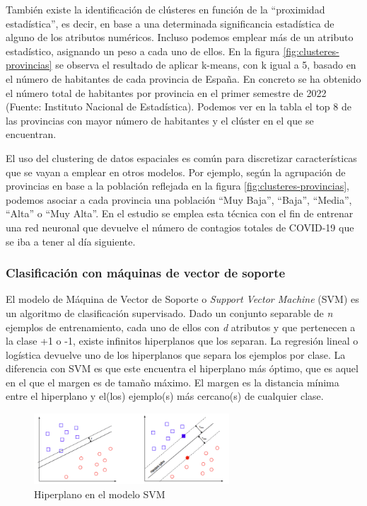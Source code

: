 También existe la identificación de clústeres en función de la “proximidad estadística”, es decir,
en base a una determinada significancia estadística de alguno de los atributos numéricos.
Incluso podemos emplear más de un atributo estadístico, asignando un peso a cada uno de ellos.
En la figura \ref{fig:clusteres-provincias} se observa el resultado de aplicar k-means, con k igual a 5, basado en el número de habitantes de cada provincia de España.
En concreto se ha obtenido el número total de habitantes por provincia en el primer semestre de 2022 (Fuente: Instituto Nacional de Estadística).
Podemos ver en la tabla el top 8 de las provincias con mayor número de habitantes y el clúster en el que se encuentran.

El uso del clustering de datos espaciales es común para discretizar características que se vayan a emplear en otros modelos.
Por ejemplo, según la agrupación de provincias en base a la población reflejada en la figura \ref{fig:clusteres-provincias},
podemos asociar a cada provincia una población “Muy Baja”, “Baja”, “Media”, “Alta” o “Muy Alta”.
En el estudio \cite{COVID} se emplea esta técnica con el fin de entrenar una red neuronal que devuelve el número de contagios totales de COVID-19
que se iba a tener al día siguiente.  

\subsubsection{Clasificación con máquinas de vector de soporte}
El modelo de Máquina de Vector de Soporte o \textit{Support Vector Machine} (SVM) es un algoritmo de clasificación supervisado.
Dado un conjunto separable de \textit{n} ejemplos de entrenamiento, cada uno de ellos con \textit{d} atributos y que pertenecen a la clase +1 o -1, 
existe infinitos hiperplanos que los separan. La regresión lineal o logística devuelve uno de los hiperplanos que separa los ejemplos por clase.
La diferencia con SVM es que este encuentra el hiperplano más óptimo, que es aquel en el que el margen es de tamaño máximo.
El margen es la distancia mínima entre el hiperplano y el(los) ejemplo(s) más cercano(s) de cualquier clase.

\begin{figure}[H]
    \centering
    \includegraphics[width=0.65\textwidth]{Imagenes/GeoAI/SVM.png}
    \caption{Hiperplano en el modelo SVM} \label{fig:svm}
\end{figure}

